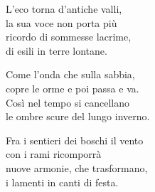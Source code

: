 
\strofa L'eco torna d'antiche valli,\\
la sua voce non porta più\\
ricordo di sommesse lacrime,\\
di esili in terre lontane.

\spazio


\spazio

\strofa Come l'onda che sulla sabbia,\\
copre le orme e poi passa e va.\\
Così nel tempo si cancellano\\
le ombre scure del lungo inverno.

\spazio


\spazio

\strofa Fra i sentieri dei boschi il vento\\
con i rami ricomporrà\\
nuove armonie, che trasformano,\\
i lamenti in canti di festa.

\spazio

